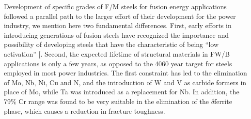 \documentclass[letterpaper,10pt,english]{jupyterBook}
\begin{document}
	\sphinxAtStartPar
	Development of specific grades of F/M steels for fusion energy applications followed a parallel path to the larger effort of their development for the power industry, we mention here two fundamental differences.  First, early efforts in introducing generations of fusion steels have recognized the importance and possibility of developing steels that have the characteristic of being “low activation” {[}\sphinxhref{https://www.osti.gov/biblio/5365778}{Gelles1985}{]}.  Second, the expected lifetime of structural materials in FW/B applications is only a few years, as opposed to the 40\sphinxhyphen{}60 year target for steels employed in most power industries.  The first constraint has led to the elimination of Mo, Nb, Ni, Cu and N, and the introduction of W and V as carbide formers in place of Mo, while Ta was introduced as a replacement for Nb. In addition,  the 7\sphinxhyphen{}9\% Cr range was found to be very suitable in the elimination of the \(\delta\)\sphinxhyphen{}ferrite phase, which causes a reduction in fracture toughness.
	
\end{document}
